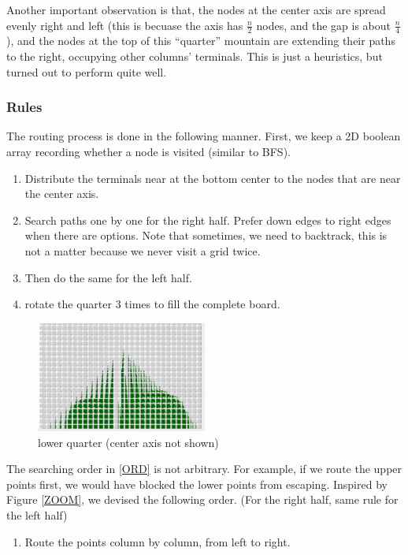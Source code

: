 \documentclass{article}
\begin{document}
\begin{spacing}{1.1}
    Another important observation is that, the nodes at the center axis are spread evenly right and left (this is becuase the axis has $\frac{n}{2}$ nodes, and the gap is about $\frac{n}{4}$), and the nodes at the top of this ``quarter'' mountain are extending their paths to the right, occupying other columns' terminals.
    This is just a heuristics, but turned out to perform quite well.
    \subsubsection{Rules}
    The routing process is done in the following manner. First, we keep a 2D boolean array recording whether a node is visited (similar to BFS).
    \begin{enumerate}[label = \roman*]
        \item Distribute the terminals near at the bottom center to the nodes that are near the center axis.
        \item Search paths one by one for the right half. Prefer down edges to right edges when there are options. Note that sometimes, we need to backtrack, this is not a matter because we never visit a grid twice. \label{ORD}
        \item Then do the same for the left half.
        \item rotate the quarter 3 times to fill the complete board.
    \end{enumerate}
    \begin{figure}[H]
        \centering
        \includegraphics[width = 0.5\textwidth]{QUA1.jpeg}
        \caption{lower quarter (center axis not shown)}
        \label{OB:RULE}
    \end{figure}
    The searching order in \ref{ORD} is not arbitrary. For example, if we route the upper points first, we would have blocked the lower points from escaping. Inspired by Figure \ref{ZOOM}, we devised the following order. (For the right half, same rule for the left half)
    \begin{enumerate}[label = \arabic*]
        \item Route the points column by column, from left to right.

\end{enumerate}
\end{spacing}
\end{document}

